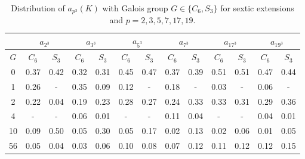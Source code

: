 \documentclass[letterpaper, 10pt]{article}
\newcommand{\1}{\mathds{1}}	%
\theoremstyle{definition}
\theoremstyle{remark}
\begin{document}
\begin{table}[H]
    \begin{center}
        \begin{tabular}{c|c|c|c|c|c|c|c|c|c|c|c|c}
            \toprule
             & \multicolumn{2}{c|}{$a_{2^3}$} & \multicolumn{2}{c|}{$a_{3^3}$} & \multicolumn{2}{c|}{$a_{5^3}$} & \multicolumn{2}{c|}{$a_{7^3}$} & \multicolumn{2}{c|}{$a_{17^3}$} & \multicolumn{2}{c}{$a_{19^3}$} \\
            \midrule
            $G$ & $C_6$ & $S_3$ & $C_6$ & $S_3$ & $C_6$ & $S_3$ & $C_6$ & $S_3$ & $C_6$ & $S_3$ & $C_6$ & $S_3$ \\
            \midrule
            0 & 0.37 & 0.42 & 0.32 & 0.31 & 0.45 & 0.47 & 0.37 & 0.39 & 0.51 & 0.51 & 0.47 & 0.44 \\
            1 & 0.26 & - & 0.35 & 0.09 & 0.12 & - & 0.18 & - & 0.03 & - & 0.06 & - \\
            2 & 0.22 & 0.04 & 0.19 & 0.23 & 0.28 & 0.27 & 0.24 & 0.33 & 0.33 & 0.31 & 0.29 & 0.36 \\
            4 & - & - & 0.06 & 0.01 & - & - & 0.11 & 0.04 & - & - & 0.04 & 0.01 \\
            10 & 0.09 & 0.50 & 0.05 & 0.30 & 0.05 & 0.17 & 0.02 & 0.13 & 0.02 & 0.06 & 0.01 & 0.05 \\
            56 & 0.05 & 0.04 & 0.03 & 0.06 & 0.10 & 0.08 & 0.07 & 0.12 & 0.11 & 0.12 & 0.12 & 0.15 \\
            \bottomrule
        \end{tabular}
        \caption{Distribution of $a_{p^3}(K)$ with Galois group $G \in \{C_6, S_3\}$ for sextic extensions and $p = 2, 3, 5, 7, 17, 19$.}
        \label{tab:sextic_pcb_dist}
    \end{center}
\end{table}
\end{document}
